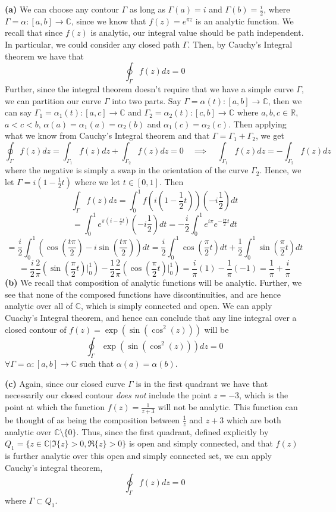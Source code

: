\documentclass[10pt]{article}
\newcommand{\R}{\mathbb{R}}
\newcommand{\C}{\mathbb{C}}
\begin{document}
\textbf{(a)}
We can choose any contour $\Gamma$ as long as $\Gamma(a) = i$ and $\Gamma(b) = \frac{i}{2}$, where $\Gamma= \alpha: [a,b] \to \C$, since we know that $f(z) = e^{\pi z}$ is an analytic function. We recall that since $f(z)$ is analytic, our integral value should be path independent. In particular, we could consider any closed path $\Gamma$. Then, by Cauchy's Integral theorem we have that
$$\oint_{\Gamma}f(z)dz = 0$$
Further, since the integral theorem doesn't require that we have a simple curve $\Gamma$, we can partition our curve $\Gamma$ into two parts. Say $\Gamma = \alpha(t): [a,b] \to \C$, then we can say $\Gamma_{1} = \alpha_{1}(t): [a,c] \to \C$ and $\Gamma_{2}= \alpha_{2}(t): [c,b] \to \C$ where $a,b,c \in \R$, $a < c < b$, $\alpha(a) = \alpha_{1}(a) = \alpha_{2}(b)$ and $\alpha_{1}(c) = \alpha_{2}(c)$. Then applying what we know from Cauchy's Integral theorem and that $\Gamma = \Gamma_{1} + \Gamma_{2}$, we get
$$\oint_{\Gamma}f(z)dz = \int_{\Gamma_{1}}f(z)dz + \int_{\Gamma_{2}}f(z)dz = 0 \hspace{1em} \implies \hspace{1em} \int_{\Gamma_{1}}f(z)dz = -\int_{\Gamma_{2}}f(z)dz$$
where the negative is simply a swap in the orientation of the curve $\Gamma_{2}$.
Hence, we let $\Gamma = i(1- \frac{1}{2}t)$ where we let $t \in [0,1]$. Then
$$\int_{\Gamma}f(z)dz = \int_{0}^{1}f(i(1-\frac{1}{2}t))(-i\frac{1}{2})dt$$
$$ = \int_{0}^{1}e^{\pi(i - \frac{i}{2}t)}(-i\frac{1}{2})dt = -\frac{i}{2}\int_{0}^{1}e^{i\pi}e^{-\frac{i\pi}{2}t}dt$$
$$ = \frac{i}{2}\int_{0}^{1}\left(\cos(\frac{t\pi}{2}) - i\sin(\frac{t\pi}{2})\right)dt = \frac{i}{2}\int_{0}^{1}\cos(\frac{\pi}{2}t)dt + \frac{1}{2}\int_{0}^{1}\sin(\frac{\pi}{2}t)dt$$
$$= \frac{i}{2}\frac{2}{\pi}\left(\sin(\frac{\pi}{2}t)\biggr\rvert_{0}^{1}\right) - \frac{1}{2}\frac{2}{\pi}\left(\cos(\frac{\pi}{2}t)\biggr\rvert_{0}^{1}\right) = \frac{i}{\pi}(1) - \frac{1}{\pi}(-1) = \frac{1}{\pi} + \frac{i}{\pi}$$
\textbf{(b)}
We recall that composition of analytic functions will be analytic. Further, we see that none of the composed functions have discontinuities, and are hence analytic over all of $\C$, which is simply connected and open. We can apply Cuachy's Integral theorem, and hence can conclude that any line integral over a closed contour of $f(z) = \exp(\sin(\cos^{2}(z)))$ will be
$$\oint_{\Gamma}\exp(\sin(\cos^{2}(z)))dz = 0$$
$\forall \Gamma = \alpha: [a,b] \to \C$ such that $\alpha(a) = \alpha(b)$.

\textbf{(c)}
Again, since our closed curve $\Gamma$ is in the first quadrant we have that necessarily our closed contour \textit{does not} include the point $z = -3$, which is the point at which the function $f(z) = \frac{1}{z+3}$ will not be analytic. This function can be thought of as being the composition between $\frac{1}{z}$ and $z+3$ which are both analytic over $\C \setminus \{0\}$. Thus, since the first quadrant, defined explicitly by $Q_{1} = \{z \in \C | \Im\{z\} > 0, \Re\{z\} > 0\}$ is open and simply connected, and that $f(z)$ is further analytic over this open and simply connected set, we can apply Cauchy's integral theorem,
$$\oint_{\Gamma} f(z)dz = 0$$
where $\Gamma \subset Q_{1}$.
\end{document}
